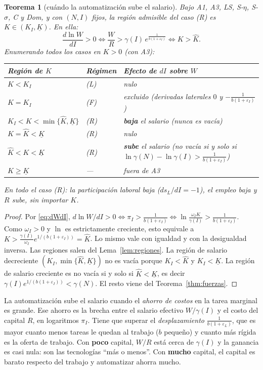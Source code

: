 \documentclass[11pt,a4paper]{article}
\numberwithin{equation}{section}
\theoremstyle{definition}
\theoremstyle{plain}
\newtheorem{teorema}[definicion]{Teorema}
\theoremstyle{remark}
\newcommand{\Kl}{\underline K}
\newcommand{\Kh}{\hat K}
\newcommand{\eps}{\varepsilon}
\begin{document}
\begin{teorema}[cuándo la automatización sube el salario]\label{thm:trampa}
Bajo \textsf{A1}, \textsf{A3}, \textsf{LS}, \textsf{S-$\eta$}, \textsf{S-$\sigma$}, \textsf{C} y \textsf{Dom}, y con
$(N,I)$ fijos, la región admisible del caso (R) es $K\in(K_I,\Kl)$. En ella:
\[
  \frac{d\ln W}{dI}>0\iff \frac{W}{R}>\gamma(I)\,e^{\frac{1}{b(1+\eps_I)}}\iff K>\Kh .
\]
Enumerando todos los casos en $K>0$ (con \textsf{A3}):
\begin{center}
\begin{tabular}{@{}llp{8.2cm}@{}}
\toprule
Región de $K$ & Régimen & Efecto de $dI$ sobre $W$\\
\midrule
$K<K_I$ & (L) & nulo\\
$K=K_I$ & (F) & excluido (derivadas laterales $0$ y $-\frac{1}{b(1+\eps_I)}$)\\
$K_I<K<\min\{\Kh,\Kl\}$ & (R) & \textbf{baja} el salario (nunca es vacía)\\
$K=\Kh<\Kl$ & (R) & nulo\\
$\Kh<K<\Kl$ & (R) & \textbf{sube} el salario (no vacía si y solo si $\ln\gamma(N)-\ln\gamma(I)>\frac{1}{b(1+\eps_I)}$)\\
$K\ge\Kl$ & --- & fuera de \textsf{A3}\\
\bottomrule
\end{tabular}
\end{center}
En todo el caso (R): la participación laboral baja ($ds_L/dI=-1$), el empleo baja y $R$ sube, \emph{sin importar
$K$}.
\end{teorema}
\begin{proof}
Por \eqref{eq:dWdI}, $d\ln W/dI>0\iff\pi_I>\frac{1}{b(1+\eps_I)}\iff\ln\frac{\omega_IK}{\gamma(I)}>\frac{1}{b(1+\eps_I)}$.
Como $\omega_I>0$ y $\ln$ es estrictamente creciente, esto equivale a $K>\frac{\gamma(I)}{\omega_I}e^{1/(b(1+\eps_I))}=\Kh$.
Lo mismo vale con igualdad y con la desigualdad inversa. Las regiones salen del Lema~\ref{lem:regiones}. La región
de salario decreciente $(K_I,\min\{\Kh,\Kl\})$ no es vacía porque $K_I<\Kh$ y $K_I<\Kl$. La región de salario
creciente es no vacía si y solo si $\Kh<\Kl$, es decir
$\gamma(I)e^{1/(b(1+\eps_I))}<\gamma(N)$. El resto viene del Teorema~\ref{thm:fuerzas}.
\end{proof}

\begin{nota}
La automatización sube el salario cuando el \emph{ahorro de costos} en la tarea marginal es grande. Ese ahorro es la
brecha entre el salario efectivo $W/\gamma(I)$ y el costo del capital $R$, en logaritmos $\pi_I$. Tiene que superar
el \emph{desplazamiento} $\frac{1}{b(1+\eps_L)}$, que es mayor cuanto menos tareas le quedan al trabajo ($b$ pequeño)
y cuanto más rígida es la oferta de trabajo. Con \textbf{poco} capital, $W/R$ está cerca de $\gamma(I)$ y la
ganancia es casi nula: son las tecnologías ``más o menos''. Con \textbf{mucho} capital, el capital es barato
respecto del trabajo y automatizar ahorra mucho.
\end{nota}
\end{document}
